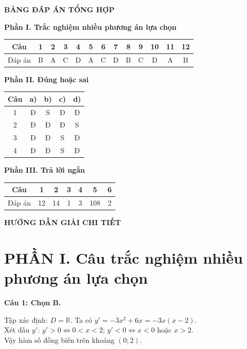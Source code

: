 \documentclass[12pt,a4paper]{article}
\newcommand{\loigiai}[1]{\par\medskip\Needspace{4\baselineskip}\noindent\textbf{#1}\par\nobreak}
\begin{document}
\newpage\pagestyle{answers}
\begin{center}\Large\textbf{BẢNG ĐÁP ÁN TỔNG HỢP}\end{center}
\textbf{Phần I. Trắc nghiệm nhiều phương án lựa chọn}
\begin{center}
\renewcommand{\arraystretch}{1.5}
\begin{tabular}{|c|*{12}{c|}}\hline
Câu & 1&2&3&4&5&6&7&8&9&10&11&12\\\hline
Đáp án & B & A & C & D & A & C & D & B & C & D & A & B \\\hline
\end{tabular}
\end{center}

\textbf{Phần II. Đúng hoặc sai}
\begin{center}
\renewcommand{\arraystretch}{1.4}
\begin{tabular}{|c|c|c|c|c|}\hline
Câu & a) & b) & c) & d)\\\hline
1 & Đ & S & Đ & Đ\\\hline
2 & Đ & Đ & Đ & S\\\hline
3 & Đ & Đ & S & Đ\\\hline
4 & Đ & Đ & S & Đ\\\hline
\end{tabular}
\end{center}

\textbf{Phần III. Trả lời ngắn}
\begin{center}
\renewcommand{\arraystretch}{1.5}
\begin{tabular}{|c|*{6}{c|}}\hline
Câu & 1 & 2 & 3 & 4 & 5 & 6\\\hline
Đáp án & 12 & 14 & 1 & 3 & 108 & 2\\\hline
\end{tabular}
\end{center}

\newpage
\begin{center}\Large\textbf{HƯỚNG DẪN GIẢI CHI TIẾT}\end{center}

\section*{PHẦN I. Câu trắc nghiệm nhiều phương án lựa chọn}

\loigiai{Câu 1: Chọn B.}
Tập xác định: $D=\mathbb R$. Ta có $y'=-3x^2+6x=-3x(x-2)$.\\
Xét dấu $y'$: $y'>0\iff 0<x<2$; $y'<0\iff x<0$ hoặc $x>2$.\\
Vậy hàm số đồng biến trên khoảng $(0;2)$.
\end{document}
